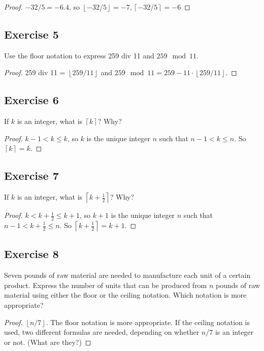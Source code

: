 \documentclass[14pt]{extarticle}
\newcommand{\floor}[1]{{\left\lfloor#1\right\rfloor}}
\newcommand{\ceil}[1]{{\left\lceil#1\right\rceil}}
\begin{document}
\begin{proof}
    $-32/5 = -6.4$, so $\floor{-32/5} = -7, \ceil{-32/5} = -6$
\end{proof}

\subsection{Exercise 5}
Use the floor notation to express 259 div 11 and $259 \mod 11$.

\begin{proof}
    259 div 11 = $\floor{259/11}$ and $259 \mod 11 = 259 - 11 \cdot \floor{259/11}$.
\end{proof}

\subsection{Exercise 6}
If $k$ is an integer, what is $\ceil{k}$? Why?

\begin{proof}
    $k-1 < k \leq k$, so $k$ is the unique integer $n$ such that $n-1 < k \leq n$. So $\ceil{k} = k$.
\end{proof}

\subsection{Exercise 7}
If $k$ is an integer, what is $\ceil{k+\frac{1}{2}}$? Why?

\begin{proof}
    $k < k + \frac{1}{2} \leq k+1$, so $k+1$ is the unique integer $n$ such that $n - 1 < k + \frac{1}{2} \leq n$. So $\ceil{k+\frac{1}{2}} = k+1$.
\end{proof}

\subsection{Exercise 8}
Seven pounds of raw material are needed to manufacture each unit of a certain product. Express the number of units that can be produced from $n$ pounds of raw material using either the floor or the ceiling notation. Which notation is more appropriate?

\begin{proof}
    $\floor{n/7}$. The floor notation is more appropriate. If the ceiling notation is used, two different formulas are needed, depending on whether $n/7$ is an integer or not. (What are they?)
\end{proof}
\end{document}
